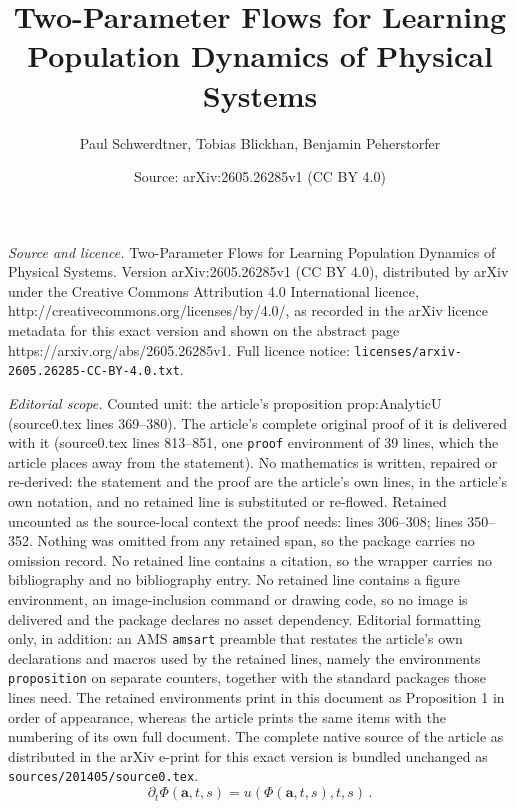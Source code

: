 \documentclass[10pt,a4paper]{amsart}
\title{Two-Parameter Flows for Learning Population Dynamics of Physical Systems}
\author{Paul Schwerdtner, Tobias Blickhan, Benjamin Peherstorfer}
\date{Source: arXiv:2605.26285v1 (CC BY 4.0)}
\newcommand{\Flow}{\Phi}
\newcommand{\bfa}{\boldsymbol{a}}
\begin{document}
\maketitle

\noindent\emph{Source and licence.} Two-Parameter Flows for Learning Population Dynamics of Physical Systems. Version arXiv:2605.26285v1 (CC BY 4.0), distributed by arXiv under the Creative Commons Attribution 4.0 International licence, http://creativecommons.org/licenses/by/4.0/, as recorded in the arXiv licence metadata for this exact version and shown on the abstract page https://arxiv.org/abs/2605.26285v1. Full licence notice: \texttt{licenses/arxiv-2605.26285-CC-BY-4.0.txt}.\par\smallskip

\noindent\textit{Editorial scope.} Counted unit: the article's proposition prop:AnalyticU (source0.tex lines 369--380). The article's complete original proof of it is delivered with it (source0.tex lines 813--851, one \texttt{proof} environment of 39 lines, which the article places away from the statement). No mathematics is written, repaired or re-derived: the statement and the proof are the article's own lines, in the article's own notation, and no retained line is substituted or re-flowed.  Retained uncounted as the source-local context the proof needs: lines 306--308; lines 350--352.  Nothing was omitted from any retained span, so the package carries no omission record.  No retained line contains a citation, so the wrapper carries no bibliography and no bibliography entry.  No retained line contains a figure environment, an image-inclusion command or drawing code, so no image is delivered and the package declares no asset dependency.  Editorial formatting only, in addition: an AMS \texttt{amsart} preamble that restates the article's own declarations and macros used by the retained lines, namely the environments \texttt{proposition} on separate counters, together with the standard packages those lines need.  The retained environments print in this document as Proposition 1 in order of appearance, whereas the article prints the same items with the numbering of its own full document.  The complete native source of the article as distributed in the arXiv e-print for this exact version is bundled unchanged as \texttt{sources/201405/source0.tex}.
\begin{equation}\label{eq:VelocityU}
        \partial_t \Flow(\bfa, t, s) = u(\Flow(\bfa, t, s), t, s)\,.
\end{equation}
\end{document}

